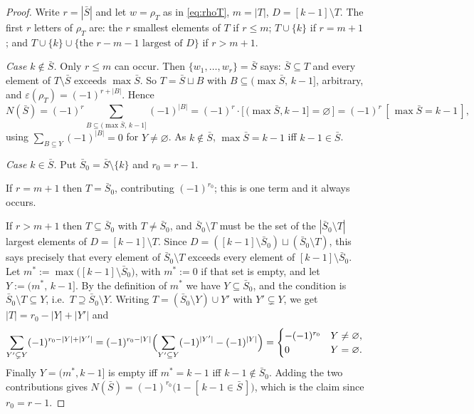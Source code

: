 \documentclass[11pt]{article}
\theoremstyle{definition}
\begin{document}
\begin{proof}
Write $r=|\bar S|$ and let $w=\rho_T$ as in \eqref{eq:rhoT}, $m=|T|$, $D=[k-1]\setminus T$.
The first $r$ letters of $\rho_T$ are: the $r$ smallest elements of $T$ if $r\le m$;
$T\cup\{k\}$ if $r=m+1$; and $T\cup\{k\}\cup\{\text{the }r-m-1\text{ largest of }D\}$ if
$r>m+1$.

\smallskip
\emph{Case $k\notin\bar S$.}  Only $r\le m$ can occur.  Then
$\{w_1,\dots,w_r\}=\bar S$ says: $\bar S\subseteq T$ and every element of $T\setminus\bar S$
exceeds $\max\bar S$.  So $T=\bar S\sqcup B$ with $B\subseteq(\max\bar S,\,k-1]$, arbitrary,
and $\varepsilon(\rho_T)=(-1)^{r+|B|}$.  Hence
\[
  N(\bar S)=(-1)^{r}\!\!\sum_{B\subseteq(\max\bar S,\,k-1]}\!\!(-1)^{|B|}
  =(-1)^{r}\cdot\bigl[\,(\max\bar S,k-1]=\varnothing\,\bigr]
  =(-1)^{r}\,[\,\max\bar S=k-1\,],
\]
using $\sum_{B\subseteq Y}(-1)^{|B|}=0$ for $Y\ne\varnothing$.  As $k\notin\bar S$,
$\max\bar S=k-1$ iff $k-1\in\bar S$.

\smallskip
\emph{Case $k\in\bar S$.}  Put $\bar S_0=\bar S\setminus\{k\}$ and $r_0=r-1$.

If $r=m+1$ then $T=\bar S_0$, contributing $(-1)^{r_0}$; this is one term and it always
occurs.

If $r>m+1$ then $T\subseteq\bar S_0$ with $T\ne\bar S_0$, and $\bar S_0\setminus T$ must be
the set of the $|\bar S_0\setminus T|$ largest elements of $D=[k-1]\setminus T$.  Since
$D=([k-1]\setminus\bar S_0)\sqcup(\bar S_0\setminus T)$, this says precisely that every
element of $\bar S_0\setminus T$ exceeds every element of $[k-1]\setminus\bar S_0$.  Let
$m^\ast:=\max\bigl([k-1]\setminus\bar S_0\bigr)$, with $m^\ast:=0$ if that set is empty,
and let $Y:=(m^\ast,\,k-1]$.  By the definition of $m^\ast$ we have $Y\subseteq\bar S_0$,
and the condition is $\bar S_0\setminus T\subseteq Y$, i.e.\ $T\supseteq\bar S_0\setminus Y$.
Writing $T=(\bar S_0\setminus Y)\cup Y'$ with $Y'\subsetneq Y$, we get
$|T|=r_0-|Y|+|Y'|$ and
\[
  \sum_{Y'\subsetneq Y}(-1)^{r_0-|Y|+|Y'|}
  =(-1)^{r_0-|Y|}\Bigl(\sum_{Y'\subseteq Y}(-1)^{|Y'|}-(-1)^{|Y|}\Bigr)
  =\begin{cases}-(-1)^{r_0}&Y\ne\varnothing,\\ 0&Y=\varnothing.\end{cases}
\]
Finally $Y=(m^\ast,k-1]$ is empty iff $m^\ast=k-1$ iff $k-1\notin\bar S_0$.  Adding the two
contributions gives $N(\bar S)=(-1)^{r_0}\bigl(1-[\,k-1\in\bar S\,]\bigr)$, which is the
claim since $r_0=r-1$.
\end{proof}
\end{document}
